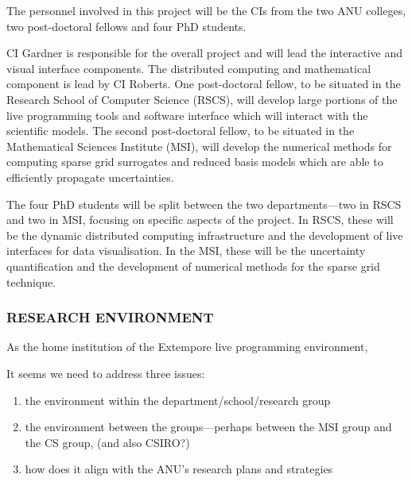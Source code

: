 \documentclass[a4paper,fontsize=12pt]{scrartcl}
\begin{document}
The personnel involved in this project will be the CIs from the two
ANU colleges, two post-doctoral fellows and four PhD
students.

CI Gardner is responsible for the overall project and will lead the
interactive and visual interface components. The distributed computing
and mathematical component is lead by CI Roberts. One post-doctoral
fellow, to be situated in the Research School of Computer Science
(RSCS), will develop large portions of the live programming tools and
software interface which will interact with the scientific models. The
second post-doctoral fellow, to be situated in the Mathematical
Sciences Institute (MSI), will develop the numerical methods for
computing sparse grid surrogates and reduced basis models which are
able to efficiently propagate uncertainties. 

The four PhD students will be split between the two departments---two
in RSCS and two in MSI, focusing on specific aspects of the project.
In RSCS, these will be the dynamic distributed computing
infrastructure and the development of live interfaces for data
visualisation. In the MSI, these will be the uncertainty
quantification and the development of numerical methods for the sparse
grid technique.

\subsubsection*{RESEARCH ENVIRONMENT}

As the home institution of the Extempore live programming environment, 


It seems we need to address three issues: 

\begin{enumerate}
\item the environment within the department/school/research group
\item the environment between the groups---perhaps between the MSI
  group and the CS group, (and also CSIRO?)
\item how does it align with the ANU's research plans and strategies
\end{enumerate}
\end{document}
